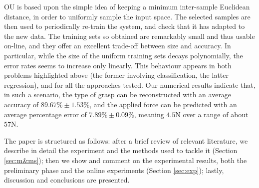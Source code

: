 OU is based upon the simple idea of keeping a minimum inter-sample
Euclidean distance, in order to uniformly sample the input space. The
selected samples are then used to periodically re-train the system,
and check that it has adapted to the new data. The training sets so
obtained are remarkably small and thus usable on-line, and they offer
an excellent trade-off between size and accuracy. In particular, while
the size of the uniform training sets decays polynomially, the error
rates seems to increase only linearly. This behaviour appears in both
problems highlighted above (the former involving classification, the
latter regression), and for all the approaches tested. Our numerical
results indicate that, in such a scenario, the type of grasp can be
reconstructed with an average accuracy of $89.67\% \pm 1.53\%$, and
the applied force can be predicted with an average percentage error of
$7.89\% \pm 0.09\%$, meaning $4.5$N over a range of about $57$N.

The paper is structured as follows: after a brief review of relevant
literature, we describe in detail the experiment and the methods used
to tackle it (Section \ref{sec:m&ms}); then we show and comment on the
experimental results, both the preliminary phase and the online
experiments (Section \ref{sec:exp}); lastly, discussion and
conclusions are presented.
